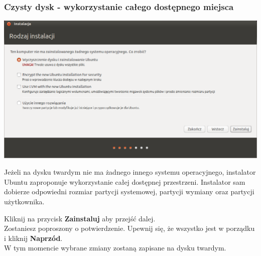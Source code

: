 \subsubsection{Czysty dysk - wykorzystanie całego dostępnego miejsca}
\begin{center}
        \includegraphics[scale=0.5]{images/instalator_partycjonowanie_proste.png}
\end{center}
Jeżeli na dysku twardym nie ma żadnego innego systemu operacyjnego, instalator Ubuntu zaproponuje wykorzystanie całej dostępnej przestrzeni. Instalator sam dobierze odpowiedni rozmiar partycji systemowej, partycji wymiany oraz partycji użytkownika.
\begin{flushright}
Kliknij na przycisk \textbf{Zainstaluj} aby przejść dalej.\\
Zostaniesz poproszony o potwierdzenie. Upewnij się, że wszystko jest w porządku i kliknij \textbf{Naprzód}.\\
W tym momencie wybrane zmiany zostaną zapisane na dysku twardym.
\end{flushright}
\clearpage
